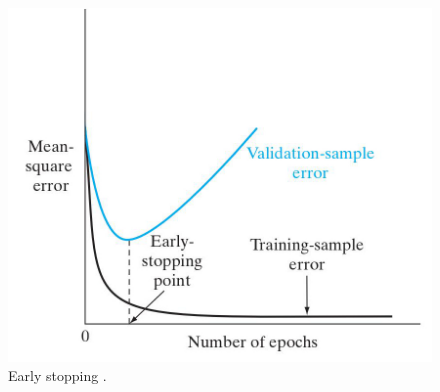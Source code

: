 \begin{figure}[!htb]
\centering
\includegraphics[width=.50\columnwidth]{images/123earlystopping}
\caption[Early stopping]{Early stopping
\cite{RefWorks:158}.}
\label{fig:123earlystopping}
\end{figure}
